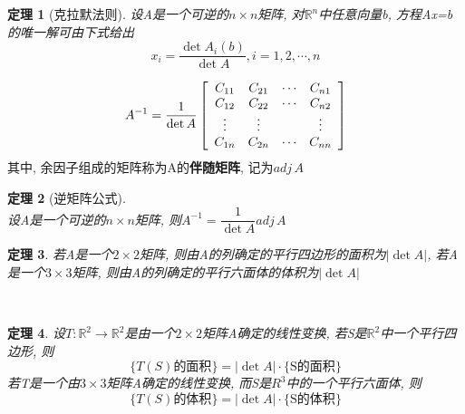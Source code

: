 \documentclass[UTF8, fontset=ubuntu]{ctexart}
\theoremstyle{nonumberplain}
\theoremstyle{plain}
\newtheorem{theorem}{定理}
\begin{document}
\begin{theorem}[克拉默法则]
设A是一个可逆的$n\times n$矩阵, 对$\mathbb{R}^n$中任意向量b, 方程Ax=b的唯一解可由下式给出
\[x_i=\frac{\det A_i(b)}{\det A},i=1,2,\cdots,n\]
\end{theorem}\vspace{4ex}

\[A^{-1}=\frac{1}{\det A}\left[\begin{array}{c c c c}
C_{11} & C_{21} & \cdots & C_{n1}\\
C_{12} & C_{22} & \cdots & C_{n2}\\
\vdots & \vdots & & \vdots\\
C_{1n} & C_{2n} & \cdots & C_{nn}
\end{array}\right]\]
其中, 余因子组成的矩阵称为A的\textbf{伴随矩阵}, 记为$adj\,A$\\[2ex]

\begin{theorem}[逆矩阵公式]\ \\
设A是一个可逆的$n\times n$矩阵, 则$A^{-1}=\dfrac{1}{\det A}adj\,A$
\end{theorem}\vspace{4ex}

\begin{theorem}
若A是一个$2\times 2$矩阵, 则由A的列确定的平行四边形的面积为$|\det A|$, 若A是一个$3\times 3$矩阵, 则由A的列确定的平行六面体的体积为$|\det A|$
\end{theorem}\vspace{4ex}

\\[2ex]

\begin{theorem}
设$T:\mathbb{R}^2\rightarrow\mathbb{R}^2$是由一个$2\times 2$矩阵A确定的线性变换, 若S是$\mathbb{R}^2$中一个平行四边形, 则
\[\{T(S)\text{的面积}\}=|\det A|\cdot\{\text{S的面积}\}\]
若T是一个由$3\times 3$矩阵A确定的线性变换, 而S是$R^3$中的一个平行六面体, 则
\[\{T(S)\text{的体积}\}=|\det A|\cdot\{\text{S的体积}\}\]
\end{theorem}
\end{document}
